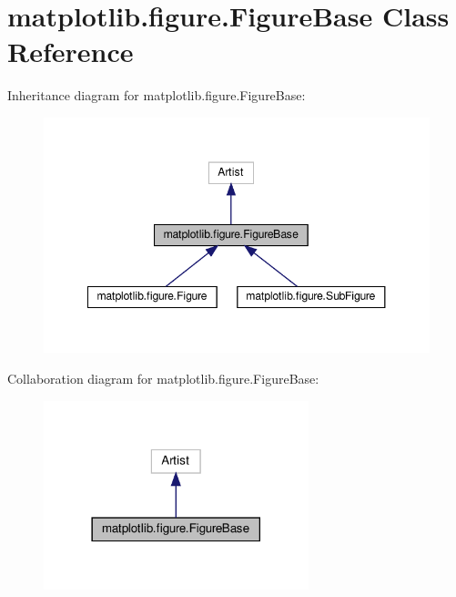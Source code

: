 \hypertarget{classmatplotlib_1_1figure_1_1FigureBase}{}\section{matplotlib.\+figure.\+Figure\+Base Class Reference}
\label{classmatplotlib_1_1figure_1_1FigureBase}


Inheritance diagram for matplotlib.\+figure.\+Figure\+Base\+:
\nopagebreak
\begin{figure}[H]
\begin{center}
\leavevmode
\includegraphics[width=348pt]{classmatplotlib_1_1figure_1_1FigureBase__inherit__graph}
\end{center}
\end{figure}


Collaboration diagram for matplotlib.\+figure.\+Figure\+Base\+:
\nopagebreak
\begin{figure}[H]
\begin{center}
\leavevmode
\includegraphics[width=218pt]{classmatplotlib_1_1figure_1_1FigureBase__coll__graph}
\end{center}
\end{figure}
